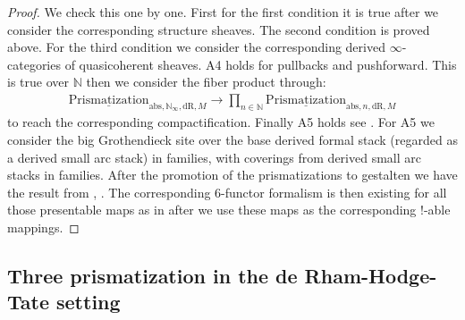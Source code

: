 \documentclass[12pt]{article}
\theoremstyle{definition}
\begin{document}
\begin{proof}
We check this one by one. First for the first condition it is true after we consider the corresponding structure sheaves. The second condition is proved above. For the third condition we consider the corresponding derived $\infty$-categories of quasicoherent sheaves. A4 holds for pullbacks and pushforward. This is true over $\mathbb{N}$ then we consider the fiber product through:
\begin{align}
{\underline{\mathrm{Prismatization}}}_{\mathrm{abs},\mathbb{N}_\infty,\mathrm{dR},M}\rightarrow  \prod_{n\in \mathbb{N}} {\underline{\mathrm{Prismatization}}}_{\mathrm{abs},n,\mathrm{dR},M}
\end{align}
to reach the corresponding compactification. Finally A5 holds see \cite[Chapter 4, in particular 4.7, 4.8, 4.9, 4.10]{3A}. For A5 we consider the big Grothendieck site over the base derived formal stack (regarded as a derived small arc stack) in families, with coverings from derived small arc stacks in families. After the promotion of the prismatizations to gestalten we have the result from \cite{5S5}, \cite{5G}. The corresponding 6-functor formalism is then existing for all those presentable maps as in \cite{5S5} after we use these maps as the corresponding !-able mappings. 
\end{proof}





\subsection{Three prismatization in the de Rham-Hodge-Tate setting}
\end{document}
